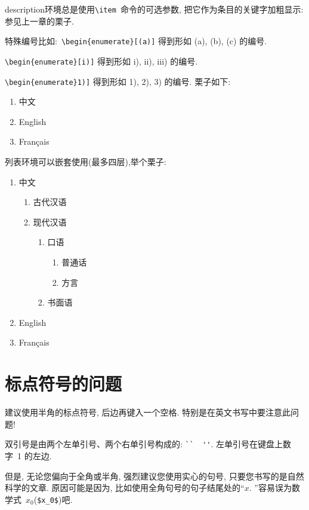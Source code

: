 \documentclass[forprint]{YAUthesis}
\begin{document}
description环境总是使用\verb|\item |命令的可选参数, 把它作为条目的关键字加粗显示:
参见上一章的栗子.

特殊编号比如:~\verb|\begin{enumerate}[(a)]| 得到形如 (a), (b), (c) 的编号.

\verb|\begin{enumerate}[i)]| 得到形如 i), ii), iii) 的编号.

\verb|\begin{enumerate}1)]| 得到形如 1), 2), 3) 的编号. 栗子如下: 

\begin{enumerate}[1)]
  \item 中文
  \item English
  \item Français
\end{enumerate}


列表环境可以嵌套使用(最多四层),举个栗子: 

\begin{enumerate}
  \item 中文
  \begin{enumerate}
    \item 古代汉语
    \item 现代汉语
    \begin{enumerate}
      \item 口语
      \begin{enumerate}
        \item 普通话
        \item 方言
      \end{enumerate}
      \item 书面语
    \end{enumerate}
  \end{enumerate}
  \item English
  \item Français
\end{enumerate}

\section{标点符号的问题}

建议使用半角的标点符号, 后边再键入一个空格. 特别是在英文书写中要注意此问题!

双引号是由两个左单引号、两个右单引号构成的: \verb|``  ''|. 左单引号在键盘上数字~1 的左边.

但是, 无论您偏向于全角或半角, 强烈建议您使用实心的句号, 只要您书写的是自然科学的文章.
原因可能是因为, 比如使用全角句号的句子结尾处的``$x$. ''容易误为数学式~$x_0$(\verb|$x_0$|)吧.
\end{document}
